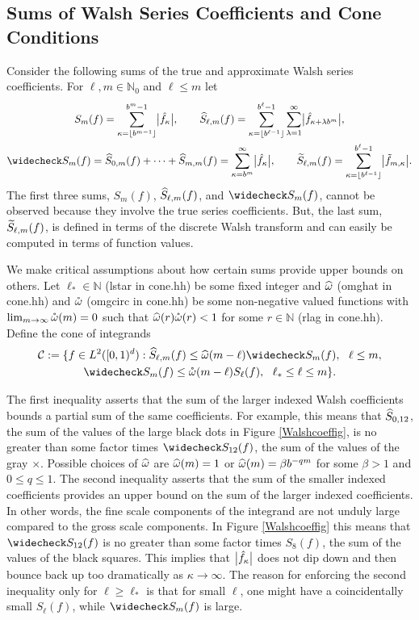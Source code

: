 \documentclass{article}
\newcommand{\N}{\mathbb{N}} %
\begin{document}
\subsection{Sums of Walsh Series Coefficients and Cone Conditions}
Consider the following sums of the true and approximate Walsh series coefficients.  For $\ell,m \in \N_0$ and $\ell \le m$ let
\begin{gather*}
S_m(f) =  \sum_{\kappa=\left \lfloor b^{m-1} \right \rfloor}^{b^{m}-1} \bigabs{\hf_{\kappa}}, \qquad 
\hS_{\ell,m}(f)  = \sum_{\kappa=\left \lfloor b^{\ell-1} \right \rfloor}^{b^{\ell}-1} \sum_{\lambda=1}^{\infty} \bigabs{ \hf_{\kappa+\lambda b^{m}}}, \\
\wcS_m(f)=\hS_{0,m}(f) + \cdots + \hS_{m,m}(f)=
\sum_{\kappa=b^{m}}^{\infty} \bigabs{\hf_{\kappa}}, \qquad
\tS_{\ell,m}(f) = \sum_{\kappa=\left \lfloor b^{\ell-1}\right \rfloor}^{b^{\ell}-1} \bigabs{\tf_{m,\kappa}}.
\end{gather*}
The first three sums, $S_{m}(f)$, $\widehat{S}_{\ell,m}(f)$, and $\wcS_m(f)$, cannot be observed because they involve the true series coefficients. But, the last sum, $\widetilde{S}_{\ell,m}(f)$, is defined in terms of the discrete Walsh transform and can easily be computed in terms of function values.

We make critical assumptions about how certain sums provide upper bounds on others.  Let $\ell_* \in \N$ (lstar in cone.hh) be some fixed integer and $\widehat{\omega}$ (omghat in cone.hh) and $\mathring{\omega}$ (omgcirc in cone.hh) be some non-negative valued functions with $\lim_{m \to \infty} \mathring{\omega}(m) = 0$ such that $\widehat{\omega}(r)\mathring{\omega}(r)<1$ for some $r\in\N$ (rlag in cone.hh).  Define the cone of integrands
\begin{multline} \label{conecond}
\cc:=\{f \in L^2(\cube) : \hS_{\ell,m}(f) \le \homega(m-\ell) \wcS_m(f),\ \ \ell \le m, \\
\wcS_m(f) \le \wcomega(m-\ell) S_{\ell}(f),\ \  \ell_* \le \ell \le m\}.
\end{multline}

The first inequality asserts that the sum of the larger indexed Walsh coefficients bounds a partial sum of the same coefficients.  For example, this means that $\widehat{S}_{0,12}$, the sum of the values of the large black dots in Figure \ref{Walshcoeffig}, is no greater than some factor times $\wcS_{12}(f)$, the sum of the values of the gray $\boldsymbol{\times}$. Possible choices of $\widehat{\omega}$ are $\widehat{\omega}(m)=1$ or $\widehat{\omega}(m)=\beta b^{-q m}$ for some $\beta>1$ and $0\le q \le 1$. The second inequality asserts that the sum of the smaller indexed coefficients provides an upper bound on the sum of the larger indexed coefficients.  In other words, the fine scale components of the integrand are not unduly large compared to the gross scale components.  In Figure \ref{Walshcoeffig} this means that $\wcS_{12}(f)$ is no greater than some factor times $S_8(f)$, the sum of the values of the black squares.  This implies that $\bigl \lvert \hat{f}_{\kappa} \bigr \rvert$ does not dip down and then bounce back up too dramatically as $\kappa \to \infty$. The reason for enforcing the second inequality only for $\ell \ge \ell_*$ is that for small $\ell$, one might have a coincidentally small $S_\ell(f)$, while $\wcS_m(f)$ is large.
\end{document}
